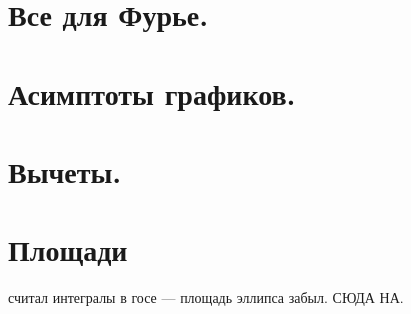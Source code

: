 \section{Все для Фурье.}

\section{Асимптоты графиков.}

\section{Вычеты.}


\section{Площади}

считал интегралы в госе --- площадь эллипса забыл. СЮДА НА.